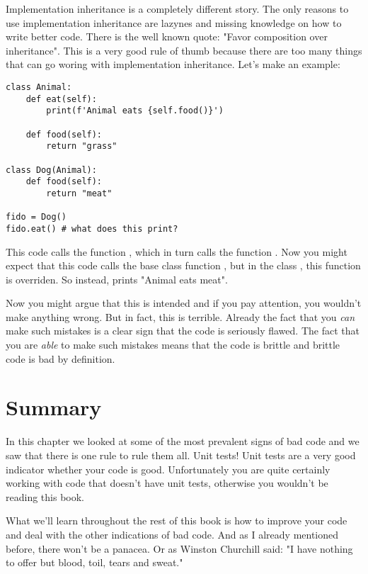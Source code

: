 Implementation inheritance is a completely different story. The only reasons to use implementation inheritance are lazynes and missing knowledge on how to write better code. There is the well known quote: "Favor composition over inheritance". This is a very good rule of thumb because there are too many things that can go woring with implementation inheritance. Let's make an example:

\begin{programcode}{}
\begin{verbatim}
class Animal:
    def eat(self):
        print(f'Animal eats {self.food()}')

    def food(self):
        return "grass"

class Dog(Animal):
    def food(self):
        return "meat"

fido = Dog()
fido.eat() # what does this print?
\end{verbatim}
\end{programcode}

This code calls the function , which in turn calls the function . Now you might expect that this code calls the base class function , but in the class , this function is overriden. So instead,  prints "Animal eats meat".

Now you might argue that this is intended and if you pay attention, you wouldn't make anything wrong. But in fact, this is terrible. Already the fact that you \textit{can} make such mistakes is a clear sign that the code is seriously flawed. The fact that you are \textit{able} to make such mistakes means that the code is brittle and brittle code is bad by definition.

\section{Summary}

In this chapter we looked at some of the most prevalent signs of bad code and we saw that there is one rule to rule them all. Unit tests! Unit tests are a very good indicator whether your code is good. Unfortunately you are quite certainly working with code that doesn't have unit tests, otherwise you wouldn't be reading this book.

What we'll learn throughout the rest of this book is how to improve your code and deal with the other indications of bad code. And as I already mentioned before, there won't be a panacea. Or as Winston Churchill said: "I have nothing to offer but blood, toil, tears and sweat."

